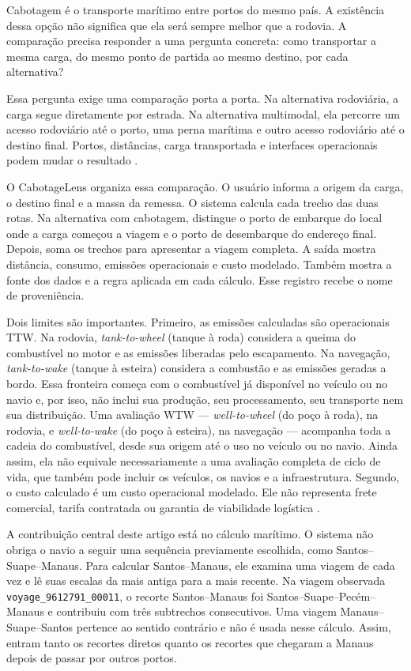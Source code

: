 \documentclass[12pt,a4paper]{article}
\newcommand{\ttw}{TTW}
\newcommand{\wtw}{WTW}
\begin{document}
Cabotagem é o transporte marítimo entre portos do mesmo país. A existência dessa opção não significa que ela será sempre melhor que a rodovia. A comparação precisa responder a uma pergunta concreta: como transportar a mesma carga, do mesmo ponto de partida ao mesmo destino, por cada alternativa?

Essa pergunta exige uma comparação porta a porta. Na alternativa rodoviária, a carga segue diretamente por estrada. Na alternativa multimodal, ela percorre um acesso rodoviário até o porto, uma perna marítima e outro acesso rodoviário até o destino final. Portos, distâncias, carga transportada e interfaces operacionais podem mudar o resultado \cite{shortsea2019,modalshiftreview2020}.

O CabotageLens organiza essa comparação. O usuário informa a origem da carga, o destino final e a massa da remessa. O sistema calcula cada trecho das duas rotas. Na alternativa com cabotagem, distingue o porto de embarque do local onde a carga começou a viagem e o porto de desembarque do endereço final. Depois, soma os trechos para apresentar a viagem completa. A saída mostra distância, consumo, emissões operacionais e custo modelado. Também mostra a fonte dos dados e a regra aplicada em cada cálculo. Esse registro recebe o nome de proveniência.

Dois limites são importantes. Primeiro, as emissões calculadas são operacionais \ttw{}. Na rodovia, \textit{tank-to-wheel} (tanque à roda) considera a queima do combustível no motor e as emissões liberadas pelo escapamento. Na navegação, \textit{tank-to-wake} (tanque à esteira) considera a combustão e as emissões geradas a bordo. Essa fronteira começa com o combustível já disponível no veículo ou no navio e, por isso, não inclui sua produção, seu processamento, seu transporte nem sua distribuição. Uma avaliação \wtw{} --- \textit{well-to-wheel} (do poço à roda), na rodovia, e \textit{well-to-wake} (do poço à esteira), na navegação --- acompanha toda a cadeia do combustível, desde sua origem até o uso no veículo ou no navio. Ainda assim, ela não equivale necessariamente a uma avaliação completa de ciclo de vida, que também pode incluir os veículos, os navios e a infraestrutura. Segundo, o custo calculado é um custo operacional modelado. Ele não representa frete comercial, tarifa contratada ou garantia de viabilidade logística \cite{competitiveness2024,decarb2024,maritimelca2024}.

A contribuição central deste artigo está no cálculo marítimo. O sistema não obriga o navio a seguir uma sequência previamente escolhida, como Santos--Suape--Manaus. Para calcular Santos--Manaus, ele examina uma viagem de cada vez e lê suas escalas da mais antiga para a mais recente. Na viagem observada \texttt{voyage\_9612791\_00011}, o recorte Santos--Manaus foi Santos--Suape--Pecém--Manaus e contribuiu com três subtrechos consecutivos. Uma viagem Manaus--Suape--Santos pertence ao sentido contrário e não é usada nesse cálculo. Assim, entram tanto os recortes diretos quanto os recortes que chegaram a Manaus depois de passar por outros portos.
\end{document}
